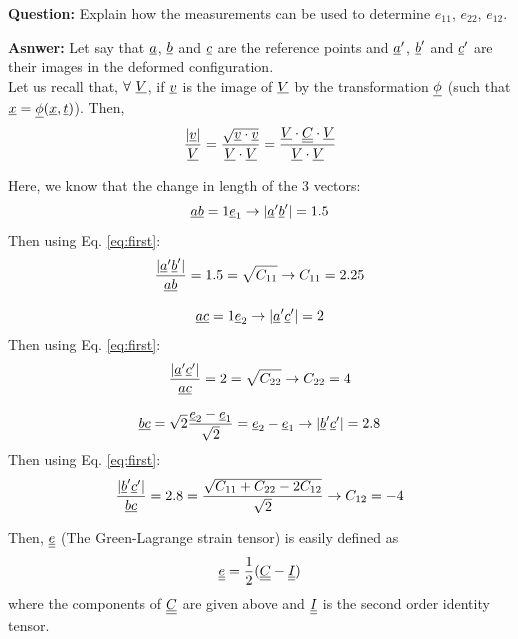 \documentclass[letter,12pt]{article}
\begin{document}
	\noindent \textbf{Question:} Explain how the measurements can be used to determine $e_{11}$, $e_{22}$, $e_{12}$.

 \noindent \textbf{Asnwer:} Let say that $\underline{a}$, $\underline{b}$ and $\underline{c}$ are the reference points and $\underline{a}'$, $\underline{b}'$ and $\underline{c}'$ are their images in the deformed configuration. \\
 
 Let us recall that, $\forall \text{ }\underline{V}$, if $\underline{v}$ is the image of $\underline{V}$ by the transformation $\underline{\phi}$ (such that $\underline{x} = \underline{\phi} (\underline{x}, \underline{t})$). Then,
 \begin{equation}
 \frac{|\underline{v}|}{\underline{V}} = \frac{\sqrt{\underline{v} \cdot \underline{v}}}{\underline{V} \cdot \underline{V}} = \frac{\underline{V} \cdot \underline{\underline{C}} \cdot \underline{V}}{\underline{V} \cdot \underline{V}}
 \label{eq:first}
 \end{equation}
 
 Here, we know that the change in length of the 3 vectors:
 \begin{equation}
 \underline{a} \underline{b} = 1 \underline{e}_1  \rightarrow |\underline{a}'\underline{b}'| = 1.5
 \end{equation}
 Then using Eq. \ref{eq:first}: 
 \begin{equation}
 \frac{|\underline{a}'\underline{b}'|}{\underline{a} \underline{b}} = 1.5 = \sqrt{C_{11}} \rightarrow C_{11} = 2.25
 \end{equation}
 
  \begin{equation}
 \underline{a} \underline{c} = 1 \underline{e}_2  \rightarrow |\underline{a}'\underline{c}'| = 2
 \end{equation}
 Then using Eq. \ref{eq:first}: 
 \begin{equation}
 \frac{|\underline{a}'\underline{c}'|}{\underline{a} \underline{c}} = 2 = \sqrt{C_{22}} \rightarrow C_{22} = 4
 \end{equation}
 
  \begin{equation}
 \underline{b} \underline{c} = \sqrt{2} \frac{\underline{e}_2 - \underline{e}_1}{\sqrt{2}} = \underline{e}_2 - \underline{e}_1  \rightarrow |\underline{b}'\underline{c}'| = 2.8
 \end{equation}
 Then using Eq. \ref{eq:first}: 
 \begin{equation}
 \frac{|\underline{b}'\underline{c}'|}{\underline{b} \underline{c}} = 2.8 = \frac{\sqrt{C_{11} + C_{22} - 2C_{12}}}{\sqrt{2}} \rightarrow C_{12} = -4
 \end{equation}

Then, $\underline{\underline{e}}$ (The Green-Lagrange strain tensor) is easily defined as
\begin{equation}
\underline{\underline{e}} = \frac{1}{2} (\underline{\underline{C}} - \underline{\underline{I}})
\end{equation}
where the components of $\underline{\underline{C}}$ are given above and $\underline{\underline{I}}$ is the second order identity tensor.

 
 
 


 
\end{document}
